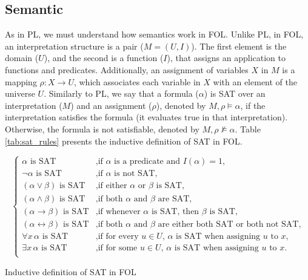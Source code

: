 \subsection{Semantic}
As in \gls{PL}, we must understand how semantics work in \gls{FOL}. Unlike \gls{PL}, in \gls{FOL}, an interpretation structure is a pair (\( M = (U, I) \)). The first element is the domain (\(U\)), and the second is a function (\(I\)), that assigns an application to functions and predicates. Additionally, an assignment of variables \( X \) in \( M \) is a mapping \( \rho : X \to U \), which associates each variable in \( X \) with an element of the universe \( U \). Similarly to \gls{PL}, we say that a formula (\(\alpha\)) is SAT over an interpretation (\( M\)) and an assignment (\(\rho\)), denoted by \( M, \rho \models \alpha \), if the interpretation satisfies the formula (it evaluates true in that interpretation). Otherwise, the formula is not satisfiable, denoted by \( M, \rho \not\models \alpha \). Table \ref{tab:sat_rules} presents the inductive definition of SAT in \gls{FOL}.


\begin{table}[h]
\[
    \left\{
    \begin{array}{ll}
        \alpha \text{ is SAT}  & \text{,if } \alpha \text{ is a predicate and } I(\alpha) = 1, \\
        \neg \alpha \text{ is SAT} & \text{,if } \alpha \text{ is not SAT,} \\
        (\alpha \lor \beta) \text{ is SAT} & \text{,if either } \alpha \text{ or } \beta \text{ is SAT,} \\
        (\alpha \land \beta) \text{ is SAT} & \text{,if both } \alpha \text{ and } \beta \text{ are SAT,} \\
        (\alpha \rightarrow \beta) \text{ is SAT} & \text{,if whenever } \alpha \text{ is SAT, then } \beta \text{ is SAT,} \\
        (\alpha \leftrightarrow \beta) \text{ is SAT} & \text{,if both } \alpha \text{ and } \beta \text{ are either both SAT or both not SAT,} \\
        \forall x \, \alpha \text{ is SAT} & \text{,if for every } u \in U\text{, } \alpha \text{ is SAT when assigning } u \text{ to } x, \\
        \exists x \, \alpha \text{ is SAT} & \text{,if for some } u \in U\text{, } \alpha \text{ is SAT when assigning } u \text{ to } x. \\
    \end{array}
    \right.
\]


    \caption{Inductive definition of SAT in \gls{FOL}}
    \label{tab:sat_rules}
    \end{table}

